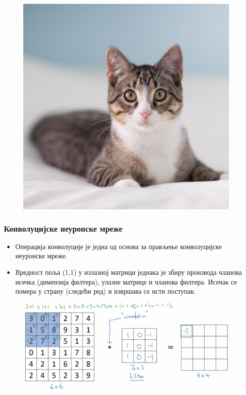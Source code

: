 \begin{frame}
\begin{figure}[H]
      \includegraphics[scale=0.07]{slike/macka}
 \end{figure}
\end{frame}

\begin{frame}
\frametitle{Конволуцијске неуронске мреже}
\begin{itemize}
 \item Операција \alert{конволуције} је једна од основа за прављење конволуцијске
 неуронске мреже.
 \item Вредност поља (1,1) у излазној матрици једнака је збиру производа
 чланова исечка (димензија филтера), улазне матрице и чланова филтера. Исечак
 се помера у страну (следећи ред) и извршава се исти поступак.
\end{itemize}
\begin{figure}[H]
  \centering
      \includegraphics[scale=0.22]{slike/ngKonvoucija.png}
 \end{figure}
\end{frame}


